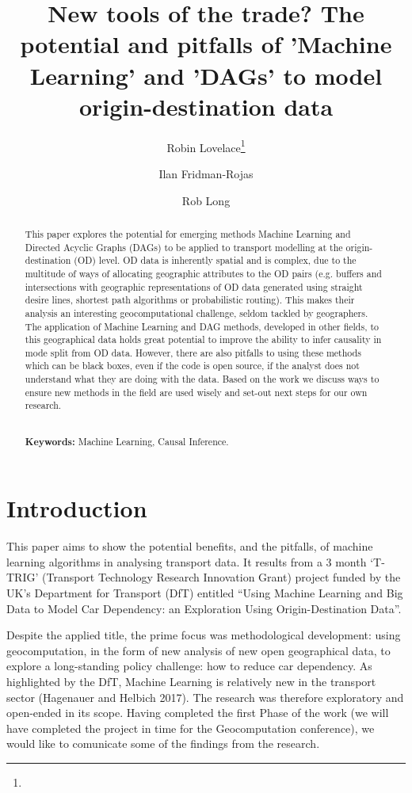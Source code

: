 \documentclass[11pt]{article}
\date{}
\title{\sffamily\fontsize{16}{0}\textbf{New tools of the trade? The potential and pitfalls of 'Machine Learning' and 'DAGs' to model origin-destination data}}
\author[1]{Robin Lovelace\thanks{}}
\author[2]{Ilan Fridman-Rojas}
\author[3]{Rob Long}
\affil[1]{Institute for Transport Studies, University of Leeds}
\affil[*]{\texttt{Email: R.Lovelace@leeds.ac.uk}}
\begin{document}
\maketitle


\begin{abstract}
\noindent
\setlength{\parindent}{0pt}

This paper explores the potential for emerging methods Machine Learning and Directed Acyclic Graphs (DAGs) to be applied to transport modelling at the origin-destination (OD) level.
OD data is inherently spatial and is complex, due to the multitude of ways of allocating geographic attributes to the OD pairs (e.g. buffers and intersections with geographic representations of OD data generated using straight desire lines, shortest path algorithms or probabilistic routing).
This makes their analysis an interesting geocomputational challenge, seldom tackled by geographers.
The application of Machine Learning and DAG methods, developed in other fields, to this geographical data holds great potential to improve the ability to infer causality in mode split from OD data. However, there are also pitfalls to using these methods which can be black boxes, even if the code is open source, if the analyst does not understand what they are doing with the data.
Based on the work we discuss ways to ensure new methods in the field are used wisely and set-out next steps for our own research.


$ $ \\ {\bf Keywords:} Machine Learning, Causal Inference.

\end{abstract}


\section{Introduction}\label{introduction}

This paper aims to show the potential benefits, and the pitfalls, of
machine learning algorithms in analysing transport data. It results from
a 3 month `T-TRIG' (Transport Technology Research Innovation Grant)
project funded by the UK's Department for Transport (DfT) entitled
``Using Machine Learning and Big Data to Model Car Dependency: an
Exploration Using Origin-Destination Data''.

Despite the applied title, the prime focus was methodological
development: using geocomputation, in the form of new analysis of new
open geographical data, to explore a long-standing policy challenge: how
to reduce car dependency. As highlighted by the DfT, Machine Learning is
relatively new in the transport sector (Hagenauer and Helbich 2017). The
research was therefore exploratory and open-ended in its scope. Having
completed the first Phase of the work (we will have completed the
project in time for the Geocomputation conference), we would like to
comunicate some of the findings from the research.
\end{document}
